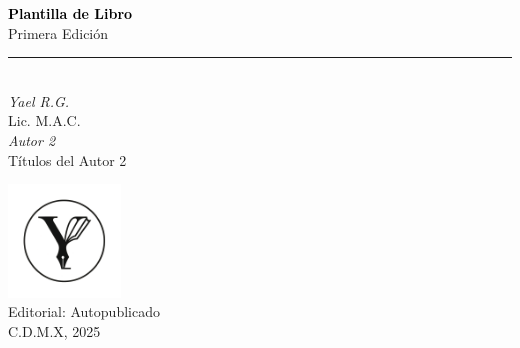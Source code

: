 
\clearpage

\begin{titlepage}
    \thispagestyle{empty} %
    \vfill

    
    \begin{center}
        
        \vspace*{2cm}
        \textcolor{black}{\Huge \textbf{Plantilla de Libro}} \\[0.7cm] 
        {\large Primera Edición} \\[0.3cm]  %

        \rule{\textwidth}{0.4pt} \\[1cm]

        {\Huge \textit{Yael R.G.}} \\[0.5cm]  %
        {\normalsize Lic. M.A.C.} \\[1.5cm]  %

        {\Huge \textit{Autor 2}} \\[0.5cm]  %
        {\normalsize Títulos del Autor 2} \\[5cm]  %
        \maketitle

        \includegraphics[width=3cm]{images/y.png} \\[1cm]  %

        {\Large Editorial: Autopublicado} \\[1cm]  %
        {\large C.D.M.X, 2025}  %
            
    \end{center}
    \vfill
\end{titlepage}
\clearpage